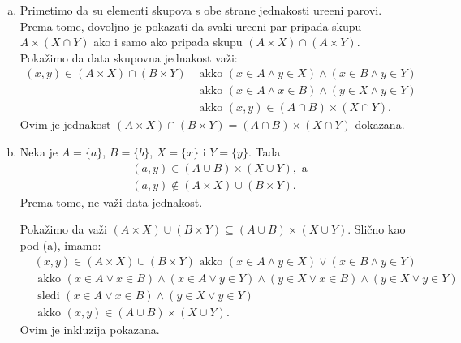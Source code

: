{
\begin{enumerate}[(a)]
\item Primetimo da su elementi skupova s obe strane jednakosti ure\dj eni parovi. Prema tome, dovoljno je pokazati da svaki ure\dj eni par pripada skupu $A\times(X\cap Y)$ ako i samo ako pripada skupu $(A\times X)\cap(A\times Y)$. Poka\v zimo da data skupovna jednakost va\v zi:
\begin{align*}
(x,y)\in (A\times X)\cap(B\times Y)&\text{ akko }(x\in A\wedge y\in X)\wedge (x\in B\wedge y\in Y)\\
&\text{ akko }(x\in A\wedge x\in B)\wedge (y\in X\wedge y\in Y)\\&
\text{ akko }(x,y)\in (A\cap B)\times(X\cap Y).
\end{align*}
Ovim je jednakost $(A\times X)\cap(B\times Y)=(A\cap B)\times(X\cap Y)$ dokazana.
\item Neka je $A=\{a\}$, $B=\{b\}$, $X=\{x\}$ i $Y=\{y\}$. Tada
\begin{align*}
&(a,y)\in(A\cup B)\times(X\cup Y),\text{ a}\\
&(a,y)\not\in (A\times X)\cup(B\times Y).
\end{align*}
Prema tome, ne va\v zi data jednakost.

Poka\v zimo da va\v zi $(A\times X)\cup(B\times Y)\subseteq (A\cup B)\times(X\cup Y)$. Sli\v cno kao pod (a), imamo:
\begin{align*}
&(x,y)\in (A\times X)\cup(B\times Y)\text{ akko }(x\in A\wedge y\in X)\vee(x\in B\wedge y\in Y)\\
&\text{ akko }(x\in A\vee x\in B)\wedge (x\in A\vee y\in Y)\wedge (y\in X\vee x\in B)\wedge (y\in X\vee y\in Y)\\
&\text{ sledi }(x\in A\vee x\in B)\wedge  (y\in X\vee y\in Y)\\
&\text{ akko }(x,y)\in (A\cup B)\times (X\cup Y).
\end{align*}
Ovim je inkluzija pokazana.
\end{enumerate}


}
